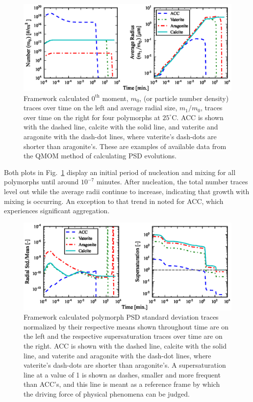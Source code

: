 \documentclass[preprint,3p,a4paper,times,12pt,authoryear]{elsarticle}
\begin{document}
\begin{figure}[h!tbp]
\begin{center}
\includegraphics{fig_3_number_and_average_radius}
\end{center}
\caption{Framework calculated $0^{\text{th}}$ moment, $\textit{m}_0$, (or particle number density) traces over time on the left and average radial size, $\textit{m}_1/\textit{m}_0$, traces over time on the right for four  polymorphs at $25^\circ$C.  ACC is shown with the dashed line, calcite with the solid line, and vaterite and aragonite with the dash-dot lines, where vaterite's dash-dots are shorter than aragonite's.  These are examples of available data from the QMOM method of calculating PSD evolutions.} 
\label{avgradius}
\end{figure} 
Both plots in Fig.~\ref{avgradius} display an initial period of nucleation and mixing for all polymorphs until around $10^{-7}$ minutes.  After nucleation, the total number traces level out while the average radii continue to increase, indicating that growth with mixing is occurring.  An exception to that trend in noted for ACC, which experiences significant aggregation.
\begin{figure}[h!tbp]
\begin{center}
\includegraphics{fig_4_standard_deviations_and_supersaturations}
\end{center}
\caption{Framework calculated polymorph PSD standard deviation traces normalized by their respective means shown throughout time are on the left and the respective supersaturation traces over time are on the right.  ACC is shown with the dashed line, calcite with the solid line, and vaterite and aragonite with the dash-dot lines, where vaterite's dash-dots are shorter than aragonite's.  A supersaturation line at a value of 1 is shown as dashes, smaller and more frequent than ACC's, and this line is meant as a reference frame by which the driving force of physical phenomena can be judged.}
\label{std_S}
\end{figure}
\end{document}
